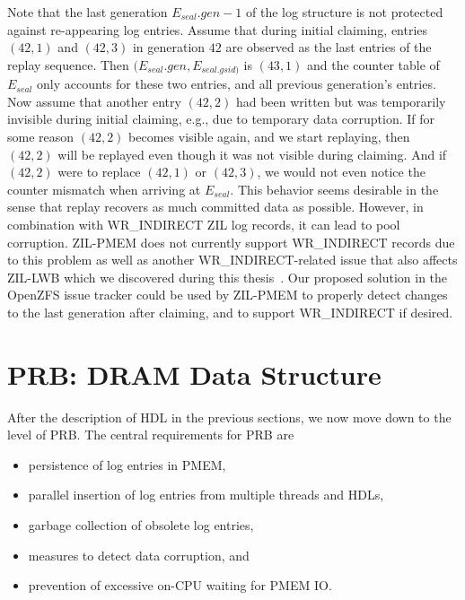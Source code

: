 \documentclass[12pt,a4paper,twoside]{book}
\begin{document}
Note that the last generation $E_{seal}.gen - 1$ of the log structure is not protected against re-appearing log entries.
Assume that during initial claiming, entries $(42,1)$ and $(42,3)$ in generation $42$ are observed as the last entries of the replay sequence.
Then $(E_{seal}.gen, E_{seal.gsid)}$ is $(43,1)$ and the counter table of $E_{seal}$ only accounts for these two entries, and all previous generation's entries.
Now assume that another entry $(42,2)$ had been written but was temporarily invisible during initial claiming, e.g., due to temporary data corruption.
If for some reason $(42,2)$ becomes visible again, and we start replaying, then $(42,2)$ will be replayed even though it was not visible during claiming.
And if $(42,2)$ were to replace $(42,1)$ or $(42,3)$, we would not even notice the counter mismatch when arriving at $E_{seal}$.
This behavior seems desirable in the sense that replay recovers as much committed data as possible.
However, in combination with WR\_INDIRECT ZIL log records, it can lead to pool corruption.
ZIL-PMEM does not currently support WR\_INDIRECT records due to this problem as well as another WR\_INDIRECT-related issue that also affects ZIL-LWB which we discovered during this thesis~\cite{OpenZFSGithubIssueZilLeaksClaimedBlocksInSeveralEdgeCases}.
Our proposed solution in the \mbox{OpenZFS} issue tracker could be used by ZIL-PMEM to properly detect changes to the last generation after claiming, and to support WR\_INDIRECT if desired.

\section{PRB: DRAM Data Structure}\label{di:prb:dramdatastructure}
After the description of HDL in the previous sections, we now move down to the level of PRB.
The central requirements for PRB are
\begin{itemize}[noitemsep]
    \item persistence of log entries in PMEM,
    \item parallel insertion of log entries from multiple threads and HDLs,
    \item garbage collection of obsolete log entries,
    \item measures to detect data corruption, and
    \item prevention of excessive on-CPU waiting for PMEM IO.
\end{itemize}
\end{document}
